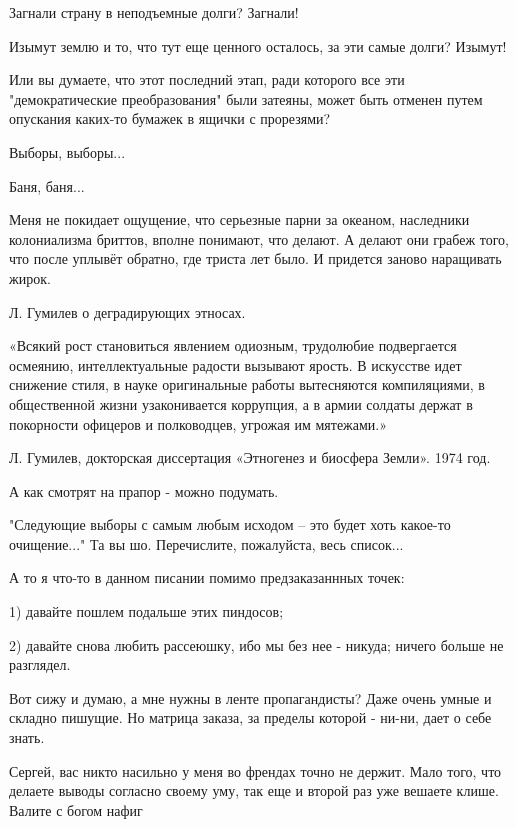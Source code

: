 \begin{itemize}
Загнали страну в неподъемные долги? Загнали!

Изымут землю и то, что тут еще ценного осталось, за эти самые долги? Изымут!

Или вы думаете, что этот последний этап, ради которого все эти "демократические
преобразования" были затеяны, может быть отменен путем опускания каких-то
бумажек в ящички с прорезями?

Выборы, выборы...

Баня, баня...

\begin{itemize} %

Меня не покидает ощущение, что серьезные парни за океаном, наследники
колониализма бриттов, вполне понимают, что делают. А делают они грабеж того,
что после уплывёт обратно, где триста лет было. И придется заново наращивать
жирок.

\end{itemize} %


Л. Гумилев о деградирующих этносах.

«Всякий рост становиться явлением одиозным, трудолюбие подвергается осмеянию,
интеллектуальные радости вызывают ярость. В искусстве идет снижение стиля, в
науке оригинальные работы вытесняются компиляциями, в общественной жизни
узаконивается коррупция, а в армии солдаты держат в покорности офицеров и
полководцев, угрожая им мятежами.»

Л. Гумилев, докторская диссертация «Этногенез и биосфера Земли». 1974 год.

А как смотрят на прапор - можно подумать.


"Следующие выборы с самым любым исходом – это будет хоть какое-то очищение..."
Та вы шо. Перечислите, пожалуйста, весь список...

А то я что-то в данном писании помимо предзаказаннных точек:

1) давайте пошлем подальше этих пиндосов;

2) давайте снова любить рассеюшку, ибо мы без нее - никуда; ничего больше не
разглядел.

Вот сижу и думаю, а мне нужны в ленте пропагандисты? Даже очень умные и складно
пишущие. Но матрица заказа, за пределы которой - ни-ни, дает о себе знать.

\begin{itemize} %
Сергей, вас никто насильно у меня во френдах точно не держит. Мало того, что
делаете выводы согласно своему уму, так еще и второй раз уже вешаете клише.
Валите с богом нафиг


\end{itemize}
\end{itemize}
